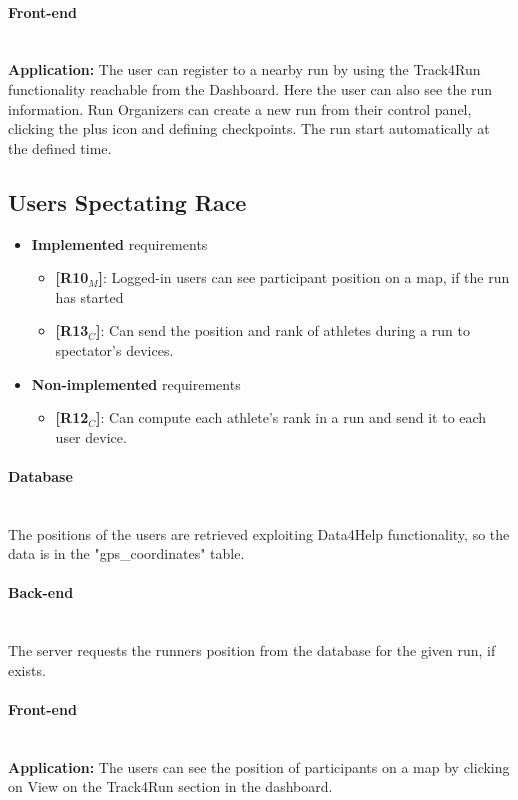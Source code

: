 \paragraph{Front-end} \mbox{}\\
\textbf{Application:} The user can register to a nearby run by using the Track4Run functionality reachable from the Dashboard. Here the user can also see the run information. Run Organizers can create a new run from their control panel, clicking the plus icon and defining checkpoints. The run start automatically at the defined time.

\subsection{Users Spectating Race}
\begin{itemize}
    \item \textbf{Implemented} requirements
        \begin{itemize}
        
        
        \item \textbf{[R10$_M$]}: Logged-in users can see participant position on a map, if the run has started



    \item \textbf{[R13$_C$]}: Can send the position and rank of athletes during a run to spectator's devices.


        \end{itemize}
    \item \textbf{Non-implemented} requirements
    \begin{itemize}
\item \textbf{[R12$_C$]}: Can compute each athlete's rank in a run and send it to each user device.
        \end{itemize}
\end{itemize}

\paragraph{Database} \mbox{}\\
The positions of the users are retrieved exploiting Data4Help functionality, so the data is in the "gps\_coordinates" table.

\paragraph{Back-end} \mbox{}\\
The server requests the runners position from the database for the given run, if exists.

\paragraph{Front-end} \mbox{}\\
\textbf{Application:} The users can see the position of participants on a map by clicking on View on the Track4Run section in the dashboard.
